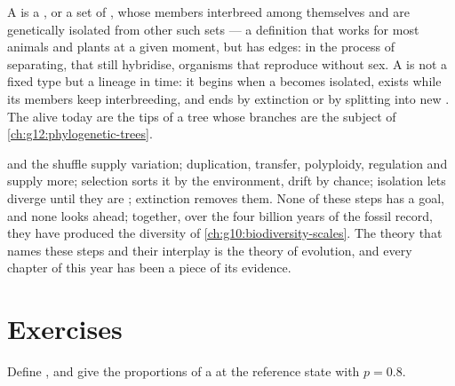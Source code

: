 \begin{proposition}\label{prop:g12:selection-drift-speciation:concept}
A  is a , or a set of , whose members
interbreed among themselves and are genetically isolated from other
such sets --- a definition that works for most animals and plants at a
given moment, but has edges:  in the process of separating,
 that still hybridise, organisms that reproduce without sex.
A  is not a fixed type but a lineage in time: it begins when a
 becomes isolated, exists while its members keep
interbreeding, and ends by extinction or by splitting into new
. The  alive today are the tips of a tree whose branches
are the subject of \cref{ch:g12:phylogenetic-trees}.
\end{proposition}
\admitted

\begin{remark}\label{rem:g12:selection-drift-speciation:assembled}
 and the shuffle supply variation; duplication, transfer,
polyploidy, regulation and  supply more; selection sorts it
by the environment, drift by chance; isolation lets 
diverge until they are ; extinction removes them. None of
these steps has a goal, and none looks ahead; together, over the
four billion years of the fossil record, they have produced the
diversity of \cref{ch:g10:biodiversity-scales}. The theory that names
these steps and their interplay is the theory of evolution, and every
chapter of this year has been a piece of its evidence.
\end{remark}

\section{Exercises}

\begin{exercise}[$\star$]\label{exo:g12:selection-drift-speciation:1}
Define , and give the  proportions of a
 at the reference state with $p = 0.8$.
\end{exercise}


